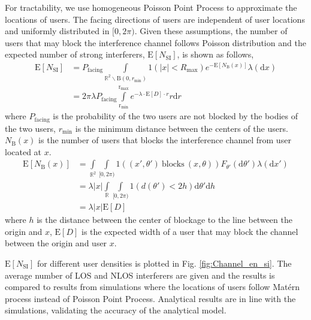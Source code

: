 \documentclass[10pt, conference, letterpaper]{IEEEtran}
\newcommand*{\rom}[1]{\uppercase\expandafter{\romannumeral #1\relax}} %
\begin{document}
For tractability, we use homogeneous Poisson Point Process to approximate the locations of users. The facing directions of users are independent of user locations and uniformly distributed in $[0, 2\pi)$. Given these assumptions, the number of users that may block the interference channel follows Poisson distribution and the expected number of strong interferers, $\mathrm{E}[N_{\text{SI}}]$, is shown as follows, 
\begin{equation}
\begin{split}
\mathrm{E}[N_{\text{SI}}] & = P_{\text{facing}}\int\limits_{\mathbb{R}^2\backslash\mathrm{B}(0,r_{\text{min}})}
\text{1}(|x|<R_{\text{max}})e^{-\mathrm{E}[N_{\mathrm{B}}(x)]}\lambda(\mathrm{d}x)\\
&= 2\pi\lambda P_{\text{facing}}\int\limits_{\mathrm{r_{min}}}^{\mathrm{r_{max}}}e^{-\lambda\cdot\mathrm{E}[D]\cdot r}r\mathrm{d}r
\end{split}
\end{equation}
where $P_{\text{facing}}$ is the probability of the two users are not blocked by the bodies of the two users, $r_{\mathrm{min}}$ is the minimum distance between the centers of the users. $N_{\mathrm{B}}(x)$ is the number of users that blocks the interference channel from user located at $x$.
\begin{equation} \label{eq:N_blockage_original}
\begin{split}
\mathrm{E}[N_{\mathrm{B}}(x)] &= \int\limits_{\mathbb{R}^2}\int\limits_{[0,2\pi)}\mathrm{1}((x',\theta')\mathrm{~blocks~}(x,\theta))F_{\theta'}(\mathrm{d}\theta')\lambda(\mathrm{d}x') \\
& = \lambda|x|\int\limits_{\mathbb{R}}\int\limits_{[0,2\pi)}\mathrm{1}(d(\theta')<2h)\mathrm{d}\theta'\mathrm{d}h \\
& = \lambda|x|\mathrm{E}[D]
\end{split}
\end{equation}
where $h$ is the distance between the center of blockage to the line between the origin and $x$, $\mathrm{E}[D]$ is the expected width of a user that may block the channel between the origin and user $x$.

$\mathrm{E}[N_{\mathrm{SI}}]$ for different user densities is plotted in Fig. \ref{fig:Channel_en_si}. The average number of LOS and NLOS interferers are given and the results is compared to results from simulations where the locations of users follow Mat\'ern \rom{3} process \cite{matern} instead of Poisson Point Process. Analytical results are in line with the simulations, validating the accuracy of the analytical model. 
\end{document}
